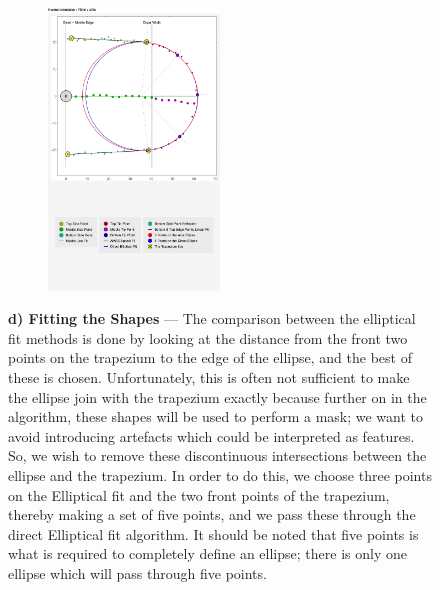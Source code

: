 \begin{figure}[p!]
\ContinuedFloat
\centering
\begin{minipage}[t]{1\textwidth}
\begin{figure}
  \begin{center}
    \includegraphics[width=0.5\textwidth]{Chapter4/Figs/Model_ShapeFitting_FSkin_Little.jpg}
  \end{center}
\end{figure}
         \textbf{d) Fitting the Shapes} --- The comparison between the elliptical fit methods is done by looking at the distance from the front two points on the trapezium to the edge of the ellipse, and the best of these is chosen. Unfortunately, this is often not sufficient to make the ellipse join with the trapezium exactly because further on in the algorithm, these shapes will be used to perform a mask; we want to avoid introducing artefacts which could be interpreted as features. So, we wish to remove these discontinuous intersections between the ellipse and the trapezium. In order to do this, we choose three points on the Elliptical fit and the two front points of the trapezium, thereby making a set of five points, and we pass these through the direct Elliptical fit algorithm. It should be noted that five points is what is required to completely define an ellipse; there is only one ellipse which will pass through five points.
    \end{minipage}
    \\

\end{figure}
